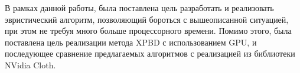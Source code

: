 В рамках данной работы, была поставлена цель разработать и реализовать эвристический алгоритм, позволяющий бороться с вышеописанной ситуацией, при этом не требуя много больше процессорного времени. Помимо этого, была поставлена цель реализации метода XPBD с использованием GPU, и последующее сравнение предлагаемых алгоритмов с реализацией из библиотеки NVidia Cloth.








 

